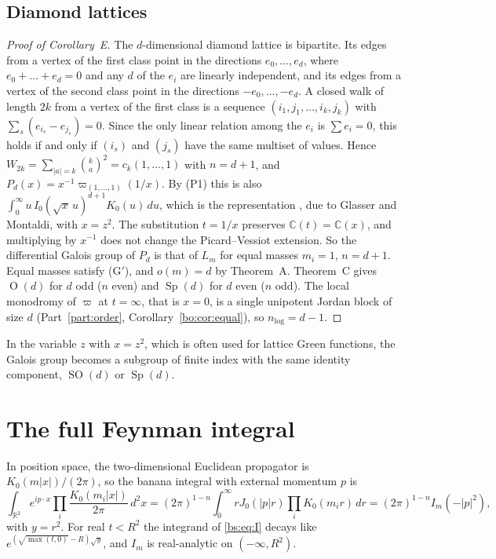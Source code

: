 \documentclass[11pt,a4paper]{article}
\theoremstyle{definition}
\theoremstyle{remark}
\numberwithin{equation}{section}
\newcommand{\C}{\mathbb{C}}
\DeclareMathOperator{\SO}{SO}
\DeclareMathOperator{\Ort}{O}
\DeclareMathOperator{\Sp}{Sp}
\begin{document}
\subsection{Diamond lattices}
\begin{proof}[Proof of Corollary~E]
The $d$-dimensional diamond lattice is bipartite. Its edges from a vertex of the first class point in the directions $e_0,\dots,e_d$, where $e_0+\dots+e_d=0$ and any $d$ of the $e_i$ are linearly independent, and its edges from a vertex of the second class point in the directions $-e_0,\dots,-e_d$. A closed walk of length $2k$ from a vertex of the first class is a sequence $(i_1,j_1,\dots,i_k,j_k)$ with $\sum_s(e_{i_s}-e_{j_s})=0$. Since the only linear relation among the $e_i$ is $\sum e_i=0$, this holds if and only if $(i_s)$ and $(j_s)$ have the same multiset of values. Hence $W_{2k}=\sum_{|a|=k}\binom{k}{a}^2=c_k(1,\dots,1)$ with $n=d+1$, and $P_d(x)=x^{-1}\varpi_{(1,\dots,1)}(1/x)$. By (P1) this is also $\int_0^\infty u\,I_0(\sqrt x\,u)^{d+1}K_0(u)\,du$, which is the representation \cite[(41)]{Gut10}, due to Glasser and Montaldi, with $x=z^2$. The substitution $t=1/x$ preserves $\C(t)=\C(x)$, and multiplying by $x^{-1}$ does not change the Picard--Vessiot extension. So the differential Galois group of $P_d$ is that of $L_m$ for equal masses $m_i=1$, $n=d+1$. Equal masses satisfy (G$'$), and $o(m)=d$ by Theorem~A. Theorem~C gives $\Ort(d)$ for $d$ odd ($n$ even) and $\Sp(d)$ for $d$ even ($n$ odd). The local monodromy of $\varpi$ at $t=\infty$, that is $x=0$, is a single unipotent Jordan block of size $d$ (Part~\ref{part:order}, Corollary~\ref{bo:cor:equal}), so $n_{\log}=d-1$.
\end{proof}

In the variable $z$ with $x=z^2$, which is often used for lattice Green functions, the Galois group becomes a subgroup of finite index with the same identity component, $\SO(d)$ or $\Sp(d)$.

\section{The full Feynman integral}\label{bs:sec:full}

In position space, the two-dimensional Euclidean propagator is $K_0(m|x|)/(2\pi)$, so the banana integral with external momentum $p$ is
\[
\int_{\mathbb R^2}e^{ip\cdot x}\prod_i\frac{K_0(m_i|x|)}{2\pi}\,d^2x=(2\pi)^{1-n}\int_0^\infty rJ_0(|p|r)\prod_iK_0(m_ir)\,dr=(2\pi)^{1-n}I_m(-|p|^2),
\]
with $y=r^2$. For real $t<R^2$ the integrand of \eqref{bs:eq:I} decays like $e^{(\sqrt{\max(t,0)}-R)\sqrt y}$, and $I_m$ is real-analytic on $(-\infty,R^2)$.
\end{document}
